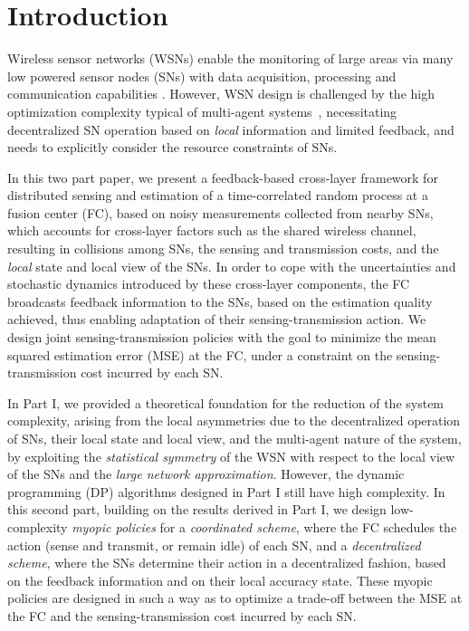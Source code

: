 \documentclass[10pt,twocolumn,twoside]{IEEEtran}
\theoremstyle{plain}
\begin{document}
\section{Introduction}
 Wireless sensor networks (WSNs) enable the monitoring of large areas via many low powered sensor nodes (SNs)
with data acquisition, processing and communication capabilities \cite{Romer}.
However, WSN design is challenged by
the high optimization complexity typical of multi-agent systems~\cite{Bernstein},
necessitating decentralized SN operation based on \emph{local} information and limited feedback,
and needs to explicitly consider the resource constraints of SNs.

In this two part paper, we present a {feedback-based} cross-layer framework for distributed sensing and estimation of a time-correlated random process at a fusion center (FC),
based on noisy measurements collected from nearby SNs,
which accounts for cross-layer factors such as the shared wireless channel, resulting in collisions among SNs, the sensing and transmission costs,
and the \emph{local} state and local view of the SNs.
In order to cope with the uncertainties and stochastic dynamics introduced by these cross-layer components,
the FC broadcasts feedback information to the SNs, based on the estimation quality achieved, thus enabling 
adaptation of their sensing-transmission action.
We design joint sensing-transmission policies with
the goal to minimize the mean squared estimation error (MSE) at the FC,
under a constraint on the sensing-transmission cost incurred by each SN.

In Part I, 
we provided a theoretical foundation for the reduction of the system complexity,
arising from the local asymmetries
 due to the decentralized operation of SNs, their local state and local view, and the multi-agent nature of the system,
 by exploiting the \emph{statistical symmetry} of the WSN with respect to the local view of the SNs and the \emph{large network approximation}.
However, the
dynamic programming (DP) algorithms designed in Part I
still have high complexity. In this second part, building on the results derived in Part I, 
we design low-complexity \emph{myopic policies} for a \emph{coordinated scheme},
where the FC schedules the action (sense and transmit, or remain idle) of each SN, and 
a \emph{decentralized scheme}, where the SNs determine their action in a decentralized fashion,
based on the feedback information and on their local accuracy state.
These myopic policies are designed in such a way as to optimize a trade-off between the MSE at the FC and the
sensing-transmission cost incurred by each SN.
\end{document}
